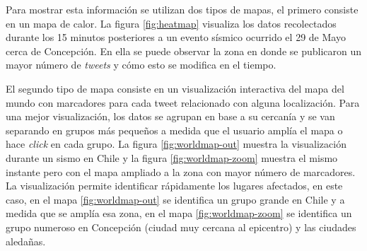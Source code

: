 	
	Para mostrar esta información se utilizan dos tipos de mapas, el primero consiste en un mapa de calor. 
	La figura \ref{fig:heatmap} visualiza los datos recolectados durante los 15 minutos posteriores a un evento sísmico ocurrido el 29 de Mayo cerca de Concepción. 
	En ella se puede observar la zona en donde se publicaron un mayor número de \textit{tweets} y cómo esto se modifica en el tiempo.
	
	
	El segundo tipo de mapa consiste en un visualización interactiva del mapa del mundo con marcadores para cada tweet relacionado con alguna localización.
	Para una mejor visualización, los datos se agrupan en base a su cercanía y se van separando en grupos más pequeños a medida que el usuario amplía el mapa o hace \textit{click} en cada grupo. 
	La figura \ref{fig:worldmap-out} muestra la visualización durante un sismo en Chile y la figura \ref{fig:worldmap-zoom} muestra el mismo instante pero con el mapa ampliado a la zona con mayor número de marcadores.
	La visualización permite identificar rápidamente los lugares afectados, en este caso, en el mapa \ref{fig:worldmap-out} se identifica un grupo grande en Chile y a medida que se amplía esa zona, en el mapa \ref{fig:worldmap-zoom} se identifica un grupo numeroso en Concepción (ciudad muy cercana al epicentro) y las ciudades aledañas.
	
